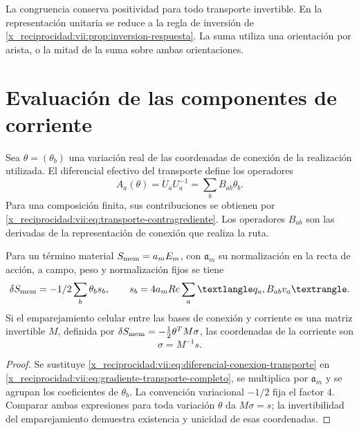 La congruencia conserva positividad para todo transporte invertible.
En la representación unitaria se reduce a la regla de inversión de
\ref{x_reciprocidad:vii:prop:inversion-respuesta}. La suma utiliza una orientación
por arista, o la mitad de la suma sobre ambas orientaciones.

\section{Evaluación de las componentes de corriente}

Sea \(\theta=(\theta_b)\) una variación real de las coordenadas
de conexión de la realización utilizada. El diferencial efectivo del
transporte define los operadores
\begin{equation}
 A_a(\theta)=\dot U_aU_a^{-1}
     =\sum_bB_{ab}\theta_b.
 \label{x_reciprocidad:vii:eq:diferencial-conexion-transporte}
\end{equation}
Para una composición finita, sus contribuciones se obtienen por
\eqref{x_reciprocidad:vii:eq:transporte-contragrediente}. Los operadores
\(B_{ab}\) son las derivadas de la representación de conexión que
realiza la ruta.

\begin{theorem}
\label{x_reciprocidad:vii:thm:corriente-conexion-evaluada}
Para un término material \(S_{\rm mem}=\mathfrak a_m E_m\),
con \(\mathfrak a_m\) su normalización en la recta de acción,
a campo, peso y normalización fijos se tiene
\begin{equation}
 \delta S_{\rm mem}=-\frac12\sum_b\theta_b s_b,\qquad
 s_b=4\mathfrak a_m\operatorname{Re}
        \sum_a\langle q_a,B_{ab}v_a\rangle.
 \label{x_reciprocidad:vii:eq:componentes-corriente-conexion}
\end{equation}
Si el emparejamiento celular entre las bases de conexión y corriente
es una matriz invertible \(M\), definida por
\(\delta S_{\rm mem}=-\tfrac12\theta^{\mathsf T}M\sigma\),
las coordenadas de la corriente son
\begin{equation}
 \sigma=M^{-1}s.
 \label{x_reciprocidad:vii:eq:coordenadas-corriente-material}
\end{equation}
\end{theorem}

\begin{proof}
Se sustituye \eqref{x_reciprocidad:vii:eq:diferencial-conexion-transporte} en
\eqref{x_reciprocidad:vii:eq:gradiente-transporte-completo}, se multiplica por
\(\mathfrak a_m\) y se agrupan los coeficientes de
\(\theta_b\). La convención variacional \(-1/2\) fija el
factor \(4\). Comparar ambas expresiones para toda variación
\(\theta\) da \(M\sigma=s\); la invertibilidad del
emparejamiento demuestra existencia y unicidad de esas coordenadas.
\end{proof}

